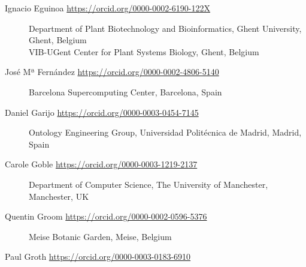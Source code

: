 \begin{description}
\item[Ignacio Eguinoa \url{https://orcid.org/0000-0002-6190-122X}]
Department of Plant Biotechnology and Bioinformatics, Ghent University,
Ghent, Belgium\\
VIB-UGent Center for Plant Systems Biology, Ghent, Belgium
\item[José Mª Fernández \url{https://orcid.org/0000-0002-4806-5140}]
Barcelona Supercomputing Center, Barcelona, Spain
\item[Daniel Garijo \url{https://orcid.org/0000-0003-0454-7145}]
Ontology Engineering Group, Universidad Politécnica de Madrid, Madrid,
Spain
\item[Carole Goble \url{https://orcid.org/0000-0003-1219-2137}]
Department of Computer Science, The University of Manchester,
Manchester, UK
\item[Quentin Groom \url{https://orcid.org/0000-0002-0596-5376}]
Meise Botanic Garden, Meise, Belgium
\item[Paul Groth \url{https://orcid.org/0000-0003-0183-6910}]

\end{description}
